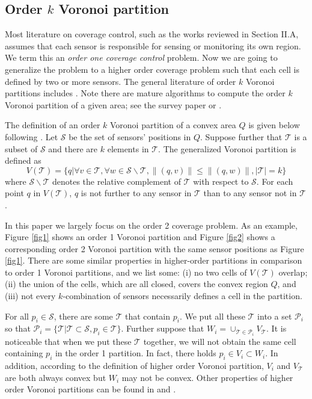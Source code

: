 \documentclass[letterpaper, 10 pt, conference]{ieeeconf}
\begin{document}
\subsection{Order $k$ Voronoi partition}
Most literature on coverage control, such as the works reviewed in Section II.A, assumes that each sensor is responsible for sensing or monitoring   its own region.
We term this an \emph{order one coverage control} problem.
Now we are going to generalize the problem to a higher order coverage problem such that each cell is defined by two or more sensors.
The general literature of order $k$ Voronoi partitions includes \cite{aurenhammer1991voronoi,boissonnat1993semidynamic}. Note there are mature algorithms to compute the order $k$ Voronoi partition of a given area; see the survey paper \cite{aurenhammer1991voronoi} or \cite{agarwal1998constructing}.

The definition of an order $k$ Voronoi partition of a convex area $Q$ is given below following \cite{agarwal1998constructing}. Let $\mathcal{S}$ be the set of sensors' positions in $Q$. Suppose further that $\mathcal{T}$ is a subset of $\mathcal{S}$ and there are $k$ elements in $\mathcal{T}$.  The generalized Voronoi partition is defined as
\begin{equation}\label{define order k}
V(\mathcal{T})=\{q |\forall v\in \mathcal{T}, \forall w\in \mathcal{S} \backslash \mathcal{T}, \|(q,v)\| \leq \|(q,w)\|,|\mathcal{T}| = k\}
\end{equation}
where $\mathcal{S}\backslash\mathcal{T}$ denotes the relative complement of $\mathcal{T}$ with respect to $\mathcal{S}$. For each point $q$ in $V(\mathcal{T})$, $q$ is not further to any sensor in $\mathcal{T}$ than to any sensor not in $\mathcal{T}$.

In this paper we largely focus on the order 2 coverage problem. As an example, Figure \ref{fig1} shows an order 1 Voronoi partition and Figure \ref{fig2} shows a corresponding order 2 Voronoi partition with the same sensor positions as Figure \ref{fig1}. There are some similar properties in higher-order partitions in comparison to order 1 Voronoi partitions, and we list some: (i) no two cells of $V(\mathcal{T})$ overlap; (ii) the union of the cells, which are all closed, covers the convex region $Q$, and (iii) not every $k$-combination of sensors necessarily defines a cell in the partition.

For all $p_i\in \mathcal{S}$, there are some $\mathcal{T}$ that contain $p_i$. We put all these $\mathcal{T}$ into a set $\mathcal{P}_i$ so that $\mathcal{P}_i=\{\mathcal{T}| \mathcal{T} \subset \mathcal{S},p_i\in\mathcal{T}\}$. Further suppose that $W_i=\cup_{\mathcal{T}\in\mathcal{P}_i} V_{\mathcal{T}}$. It is noticeable that when we put these $\mathcal{T}$ together, we will not obtain the same cell containing $p_i$ in the order 1 partition. In fact, there holds $p_i\in V_i\subset W_i$. In addition, according to the definition of higher order Voronoi partition, $V_i$ and $V_{\mathcal{T}}$ are both always convex but $W_i$ may not be convex. Other properties of higher order Voronoi partitions can be found in \cite{chazelle1987improved} and \cite{lee1982k}. 
\end{document}
